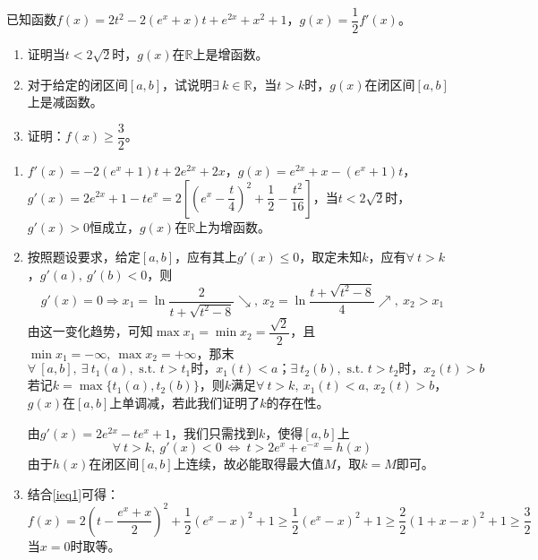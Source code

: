 \begin{que}
	已知函数$f(x)=2t^2-2(e^x+x)t+e^{2x}+x^2+1$，$g(x)=\dfrac{1}{2}f'(x)$。
	\begin{enumerate}
		\item 证明当$t<2\sqrt{2}$时，$g(x)$在$\mathbb{R}$上是增函数。
		\item 对于给定的闭区间$[a,b]$，试说明$\exists\ k\in \mathbb{R}$，当$t>k$时，$g(x)$在闭区间$[a,b]$上是减函数。
		\item 证明：$f(x)\geqslant\dfrac{3}{2}$。
	\end{enumerate}
\end{que}
\sol \begin{enumerate}
	\item $f'(x)=-2(e^x+1)t+2e^{2x}+2x$，$g(x)=e^{2x}+x-(e^x+1)t$，$g'(x)=2e^{2x}+1-te^x=2\left[\left(e^{x}-\dfrac{t}{4}\right)^2+\dfrac{1}{2}-\dfrac{t^2}{16}\right]$，当$t<2\sqrt{2}$时，$g'(x)>0$恒成立，$g(x)$在$\mathbb{R}$上为增函数。
	\item {}按照题设要求，给定$[a,b]$，应有其上$g'(x)\leqslant 0$，取定未知$k$，应有$\forall\ t>k$，$g'(a),\ g'(b)<0$，则$$g'(x)=0\Rightarrow x_1=\ln\dfrac{2}{t+\sqrt{t^2-8}}\searrow ,\ x_2=\ln\dfrac{t+\sqrt{t^2-8}}{4}\nearrow ,\ x_2>x_1$$
	由这一变化趋势，可知$\max x_1=\min x_2=\dfrac{\sqrt{2}}{2}$，且$\min x_1=-\infty,\ \max x_2=+\infty$，那末$$\forall\ [a,b],\ \exists \ t_1(a), \text{\ s.t.\ }t>t_1\text{时，} x_1(t)<a\text{；}\exists\ t_2(b), \text{\ s.t.\ }t>t_2\text{时，} x_2(t)>b$$
	若记$k=\max\{t_1(a),t_2(b)\}$，则$k$满足$\forall\ t>k,\ x_1(t)<a,\ x_2(t)>b$，$g(x)$在$[a,b]$上单调减，若此我们证明了$k$的存在性。\par
	由$g'(x)=2e^{2x}-te^x+1$，我们只需找到$k$，使得$[a,b]$上$$\forall\ t>k,\ g'(x)<0\ \Leftrightarrow\ t>2e^x+e^{-x}=h(x)$$由于$h(x)$在闭区间$[a,b]$上连续，故必能取得最大值$M$，取$k=M$即可。
	\item 结合\ref{ieq1}可得：$$f(x)=2\left(t-\dfrac{e^x+x}{2}\right)^2+\dfrac{1}{2}(e^x-x)^2+1\geqslant \dfrac{1}{2}(e^x-x)^2+1\geqslant \dfrac{2}{2}(1+x-x)^2+1\geqslant \dfrac{3}{2}$$当$x=0$时取等。
\end{enumerate}\par\hfill\gk{}\easy\par

